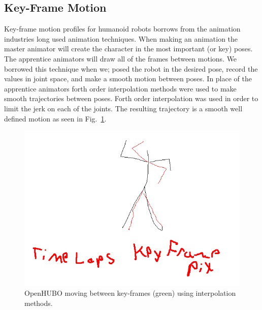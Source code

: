 \subsection{Key-Frame Motion}\label{sec:sec:keyframe}

Key-frame motion profiles for humanoid robots borrows from the animation industries long used animation techniques.  
When making an animation the master animator will create the character in the most important (or key) poses.  
The apprentice animators will draw all of the frames between motions.  
We borrowed this technique when we; posed the robot in the desired pose, record the values in joint space, and make a smooth motion between poses.  In place of the apprentice animators forth order interpolation methods were used to make smooth trajectories between poses.  Forth order interpolation was used in order to limit the jerk on each of the joints.  The resulting trajectory is a smooth well defined motion as seen in Fig.~\ref{fig:keyframe-throw}.

\begin{figure}[t]
  \centering
\includegraphics[width=1.0\columnwidth]{./pix/fakeThrow.png}
  \caption{OpenHUBO moving between key-frames (green) using interpolation methods.}
  \label{fig:keyframe-throw}
\end{figure}